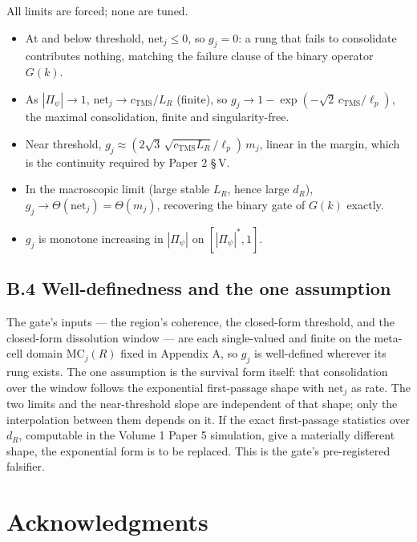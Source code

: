 \documentclass[11pt,oneside]{report}
\theoremstyle{definition}
\theoremstyle{remark}
\begin{document}
All limits are forced; none are tuned.
\begin{itemize}
\item At and below threshold, \ensuremath{\mathrm{net}_j \le 0}, so
\ensuremath{g_j = 0}: a rung that fails to consolidate contributes nothing,
matching the failure clause of the binary operator \ensuremath{G(k)}.
\item As \ensuremath{|\Pi_\psi| \to 1}, \ensuremath{\mathrm{net}_j \to c_{\mathrm{TMS}}/L_R}
(finite), so \ensuremath{g_j \to 1 - \exp(-\sqrt{2}\,c_{\mathrm{TMS}}/\ell_p)},
the maximal consolidation, finite and singularity-free.
\item Near threshold, \ensuremath{g_j \approx (2\sqrt{3}\,\sqrt{c_{\mathrm{TMS}} L_R}/\ell_p)\,m_j},
linear in the margin, which is the continuity required by Paper 2 \S\,V.
\item In the macroscopic limit (large stable \ensuremath{L_R}, hence large
\ensuremath{d_R}), \ensuremath{g_j \to \Theta(\mathrm{net}_j) = \Theta(m_j)},
recovering the binary gate of \ensuremath{G(k)} exactly.
\item \ensuremath{g_j} is monotone increasing in \ensuremath{|\Pi_\psi|} on
\ensuremath{[|\Pi_\psi|^{*}, 1]}.
\end{itemize}

\subsection*{B.4 Well-definedness and the one assumption}

The gate's inputs --- the region's coherence, the closed-form threshold, and
the closed-form dissolution window --- are each single-valued and finite on the
meta-cell domain \ensuremath{\mathrm{MC}_j(R)} fixed in Appendix A, so
\ensuremath{g_j} is well-defined wherever its rung exists. The one assumption
is the survival form itself: that consolidation over the window follows the
exponential first-passage shape with \ensuremath{\mathrm{net}_j} as rate. The
two limits and the near-threshold slope are independent of that shape; only the
interpolation between them depends on it. If the exact first-passage statistics
over \ensuremath{d_R}, computable in the Volume 1 Paper 5 simulation, give a
materially different shape, the exponential form is to be replaced. This is the
gate's pre-registered falsifier.

\section*{Acknowledgments}
\end{document}
